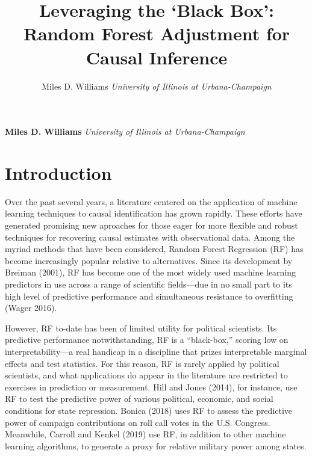 \documentclass[11pt,]{article}
\title{Leveraging the `Black Box': Random Forest Adjustment for Causal Inference  }
\author{\Large Miles D. Williams\vspace{0.05in} \newline\normalsize\emph{University of Illinois at Urbana-Champaign}  }
\date{}
\newcommand*{\authorfont}{\fontfamily{phv}\selectfont}
\begin{document}
	
%

{%
\setlength{\parindent}{0pt}
\thispagestyle{plain}
{\fontsize{18}{20}\selectfont\raggedright 
\maketitle  %

}

{
   \vskip 13.5pt\relax \normalsize\fontsize{11}{12} 
\textbf{\authorfont Miles D. Williams} \hskip 15pt \emph{\small University of Illinois at Urbana-Champaign}   

}

}






\vskip -8.5pt



\noindent \doublespacing 

\hypertarget{introduction}{%
\section{Introduction}\label{introduction}}

Over the past several years, a literature centered on the application of
machine learning techniques to causal identification has grown rapidly.
These efforts have generated promising new aproaches for those eager for
more flexible and robust techniques for recovering causal estimates with
observational data. Among the myriad methods that have been considered,
Random Forest Regression (RF) has become increasingly popular relative
to alternatives. Since its development by Breiman (2001), RF has become
one of the most widely used machine learning predictors in use across a
range of scientific fields---due in no small part to its high level of
predictive performance and simultaneous resistance to overfitting (Wager
2016).

However, RF to-date has been of limited utility for political
scientists. Its predictive performance notwithstanding, RF is a
``black-box,'' scoring low on interpretability---a real handicap in a
discipline that prizes interpretable marginal effects and test
statistics. For this reason, RF is rarely applied by political
scientists, and what applications do appear in the literature are
restricted to exercises in prediction or measurement. Hill and Jones
(2014), for instance, use RF to test the predictive power of various
political, economic, and social conditions for state repression. Bonica
(2018) uses RF to assess the predictive power of campaign contributions
on roll call votes in the U.S. Congress. Meanwhile, Carroll and Kenkel
(2019) use RF, in addition to other machine learning algorithms, to
generate a proxy for relative military power among states.
\end{document}
